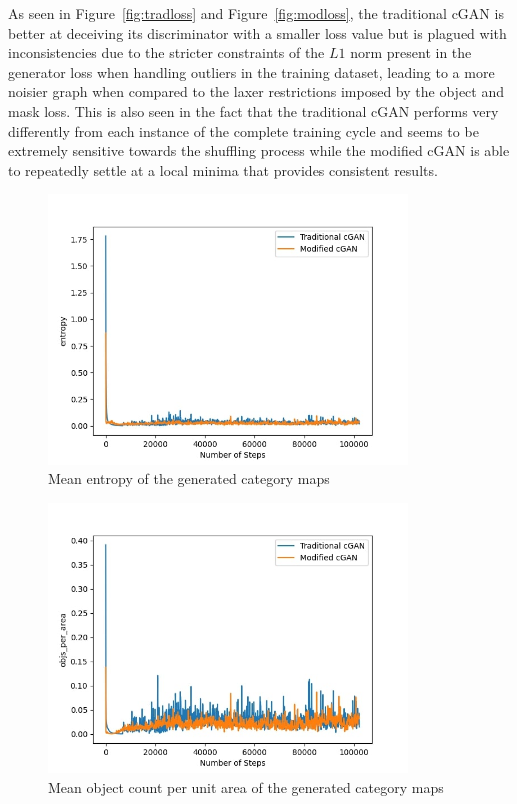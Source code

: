 \documentclass{Configuration_Files/PoliMi3i_thesis}
\begin{document}
As seen in Figure~\ref{fig:tradloss} and Figure~\ref{fig:modloss}, the traditional cGAN is better at deceiving its
discriminator with a smaller loss value but is plagued with inconsistencies due to the 
stricter constraints of the $L1$ norm present in the generator loss when handling 
outliers in the training dataset, leading to a more noisier graph when compared to 
the laxer restrictions imposed by the object and mask loss. This is also seen in the fact 
that the traditional cGAN performs very differently from each instance of the 
complete training cycle and seems to be extremely sensitive towards the shuffling 
process while the modified cGAN is able to repeatedly settle at a local minima that 
provides consistent results.
\begin{figure}[H]
    \centering
    \includegraphics[width=0.85\textwidth]{entropy.jpg}
    \caption{Mean entropy of the generated category maps}
    \label{fig:entropy}
\end{figure}
\begin{figure}[H]
    \centering
    \includegraphics[width=0.85\textwidth]{obj_count.jpg}
    \caption{Mean object count per unit area of the generated category maps}
    \label{fig:objcount}
\end{figure}
\end{document}
